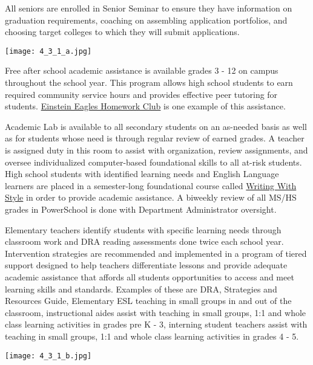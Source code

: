 \begin{findings}
All seniors are enrolled in Senior Seminar to ensure they have information on graduation requirements, coaching on assembling application portfolios, and choosing target colleges to which they will submit applications.

{\centering\texttt{[image: 4\_3\_1\_a.jpg]}}

Free after school academic assistance is available grades 3 - 12 on campus throughout the school year. This program allows high school students to earn required community service hours and provides effective peer tutoring for students.  \href{http://blogs.cmis.ac.th/newsletter/2015/09/17/einstein-eagles-starts-monday-get-involved/}{Einstein Eagles Homework Club} is one example of this assistance.

Academic Lab is available to all secondary students on an as-needed basis as well as for students whose need is through regular review of earned grades. A teacher is assigned duty in this room to assist with organization, review assignments, and oversee individualized computer-based foundational skills to all at-risk students. High school students with identified learning needs and English Language learners are placed in a semester-long foundational course called \href{https://drive.google.com/open?id=100aj_4W2p7cnSRhdpkEhTtGRoBIBMe6Uy8JgKBVyofk}{Writing With Style} in order to provide academic assistance. A biweekly review of all MS/HS grades in PowerSchool is done with Department Administrator oversight.

Elementary teachers identify students with specific learning needs through classroom work and DRA reading assessments done twice each school year. Intervention strategies are recommended and implemented in a program of tiered support designed to help teachers differentiate lessons and provide adequate academic assistance that affords all students opportunities to access and meet learning skills and standards. Examples of these are DRA, Strategies and Resources Guide, Elementary ESL teaching in small groups in and out of the classroom, instructional aides assist with teaching in small groups, 1:1 and whole class learning activities in grades pre K - 3, interning student teachers assist with teaching in small groups, 1:1 and whole class learning activities in grades 4 - 5. 

{\centering\texttt{[image: 4\_3\_1\_b.jpg]}}


\end{findings}
